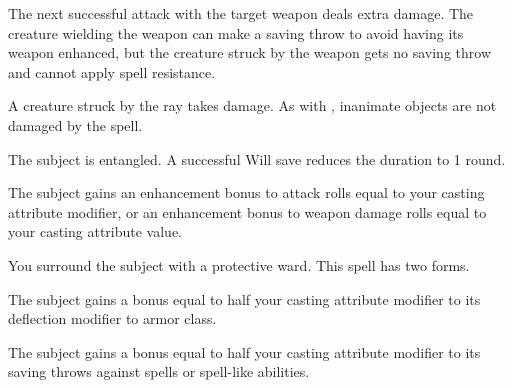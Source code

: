 \spellrng{\rngclose}
\begin{spelleffect}
The next successful attack with the target weapon deals extra damage. The creature wielding the weapon can make a saving throw to avoid having its weapon enhanced, but the creature struck by the weapon gets no saving throw and cannot apply spell resistance.
\end{spelleffect}

\spellrng{\rngclose}
\begin{spelleffect}
A creature struck by the ray takes damage. As with , inanimate objects are not damaged by the spell.
\end{spelleffect}

\spellrng{\rngclose}
\begin{spelleffect}
The subject is entangled. A successful Will save reduces the duration to 1 round.
\end{spelleffect}

\spellrng{\rngmed}
\begin{spelleffect}
The subject gains an enhancement bonus to attack rolls equal to your casting attribute modifier, or an enhancement bonus to weapon damage rolls equal to your casting attribute value.
\end{spelleffect}

\spellrng{\rngclose}
\begin{spelleffect}
\par You surround the subject with a protective ward. This spell has two forms.
\par {} The subject gains a bonus equal to half your casting attribute modifier to its deflection modifier to armor class.
\par {} The subject gains a bonus equal to half your casting attribute modifier to its saving throws against spells or spell-like abilities.
\end{spelleffect}

